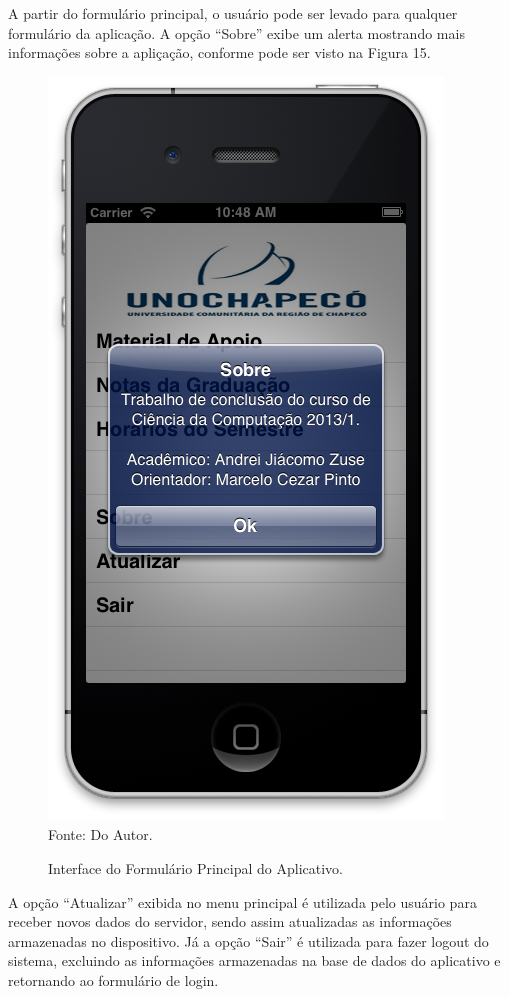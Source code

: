A partir do formulário principal, o usuário pode ser levado para qualquer formulário da aplicação. A opção ``Sobre'' exibe um alerta mostrando mais informações sobre a apliçação, conforme pode ser visto na Figura 15.

\begin{figure}[!htb]
     \centering
     \caption[Formulário Principal - Interface]{Interface do Formulário Principal do Aplicativo.}
     \includegraphics[scale=0.5]{imagens/formsobre.png}
     \\  Fonte: Do Autor.
\end{figure}
\newpage

A opção ``Atualizar'' exibida no menu principal é utilizada pelo usuário para receber novos dados do servidor, sendo assim atualizadas as informações armazenadas no dispositivo. Já a opção ``Sair'' é utilizada para fazer logout do sistema, excluindo as informações armazenadas na base de dados do aplicativo e retornando ao formulário de login.

